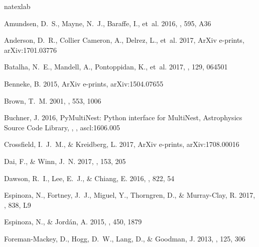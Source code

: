 \documentclass[twocolumn, trackchanges]{aastex61}
\begin{document}
\begin{thebibliography}{}
\expandafter\ifx\csname natexlab\endcsname\relax\def\natexlab#1{#1}\fi
\providecommand{\url}[1]{\href{#1}{#1}}

{Amundsen}, D.~S., {Mayne}, N.~J., {Baraffe}, I., {et~al.} 2016, \aap, 595, A36

{Anderson}, D.~R., {Collier Cameron}, A., {Delrez}, L., {et~al.} 2017, ArXiv
  e-prints, arXiv:1701.03776

{Batalha}, N.~E., {Mandell}, A., {Pontoppidan}, K., {et~al.} 2017, \pasp, 129,
  064501

{Benneke}, B. 2015, ArXiv e-prints, arXiv:1504.07655

{Brown}, T.~M. 2001, \apj, 553, 1006

{Buchner}, J. 2016, {PyMultiNest: Python interface for MultiNest}, Astrophysics
  Source Code Library, , , ascl:1606.005

{Crossfield}, I.~J.~M., \& {Kreidberg}, L. 2017, ArXiv e-prints,
  arXiv:1708.00016

{Dai}, F., \& {Winn}, J.~N. 2017, \aj, 153, 205

{Dawson}, R.~I., {Lee}, E.~J., \& {Chiang}, E. 2016, \apj, 822, 54

{Espinoza}, N., {Fortney}, J.~J., {Miguel}, Y., {Thorngren}, D., \&
  {Murray-Clay}, R. 2017, \apjl, 838, L9

{Espinoza}, N., \& {Jord{\'a}n}, A. 2015, \mnras, 450, 1879

{Foreman-Mackey}, D., {Hogg}, D.~W., {Lang}, D., \& {Goodman}, J. 2013, \pasp,
  125, 306


\end{thebibliography}
\end{document}

